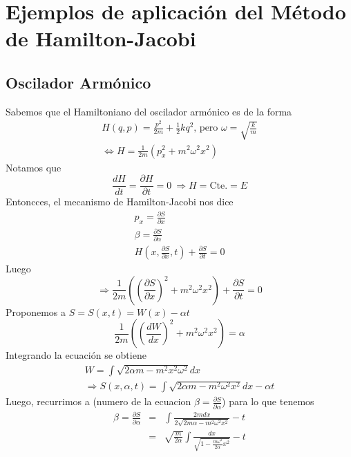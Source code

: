 \documentclass[12pt]{report}
\begin{document}
\section{Ejemplos de aplicación del Método de Hamilton-Jacobi}
\subsection{Oscilador Armónico}
Sabemos que el Hamiltoniano del oscilador armónico es de la forma
\begin{eqnarray}
H(q,p)=\frac{p^2}{2m}+\frac{1}{2}kq^2\text{, pero $\omega=\sqrt{\frac{k}{m}}$} \\
\Leftrightarrow H=\frac{1}{2m}(p_x^2+m^2\omega^2x^2)
\end{eqnarray}
Notamos que
\begin{equation}
\frac{dH}{dt}=\frac{\partial H}{\partial t}=0\ \Rightarrow H=\text{Cte.}=E
\end{equation}
Entoncces, el mecanismo de Hamilton-Jacobi nos dice
\begin{eqnarray}
&p_x=\displaystyle\frac{\partial S}{\partial x}&\\ &\beta=\displaystyle\frac{\partial S}{\partial \alpha}&\\  &H(x,\frac{\partial S}{\partial x},t)+\displaystyle\frac{\partial S}{\partial t}=0&
\end{eqnarray}
Luego
\begin{equation}
\Rightarrow \frac{1}{2m}\left( \left(\frac{\partial S}{\partial x}\right)^2+m^2\omega^2x^2\right)+\frac{\partial S}{\partial t}=0
\end{equation}
Proponemos a $S=S(x,t)=W(x)-\alpha t$
\begin{equation}
\frac{1}{2m}\left(\left(\frac{dW}{dx}\right)^2+m^2\omega^2x^2\right)=\alpha
\end{equation}
Integrando la ecuación se obtiene
\begin{eqnarray}
W=\int\sqrt{2\alpha m-m^2x^2\omega^2}dx\ \\ \Rightarrow S(x,\alpha,t)=\int\sqrt{2\alpha m-m^2\omega^2x^2}dx-\alpha t
\end{eqnarray}
Luego, recurrimos a (numero de la ecuacion $\beta=\frac{\partial S}{\partial \alpha}$) para lo que tenemos
\begin{eqnarray}
\beta=\frac{\partial S}{\partial \alpha}&=&\int\frac{2mdx}{2\sqrt{2m\alpha-m^2\omega^2x^2}}-t \\ &=& \sqrt{\frac{m}{2\alpha}}\int\frac{dx}{\sqrt{1-\frac{m\omega^2}{2\alpha}x^2}}-t
\end{eqnarray}
\end{document}
